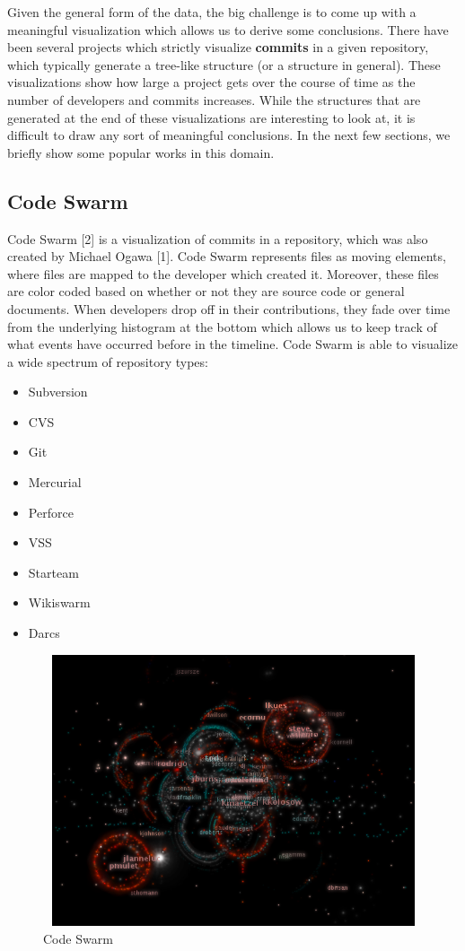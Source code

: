 \documentclass{article}
\begin{document}
Given the general form of the data, the big challenge is to come up with a meaningful visualization which allows us to derive some conclusions.  There have been several projects which strictly visualize \textbf{commits} in a given repository, which typically generate a tree-like structure (or a structure in general). These visualizations show how large a project gets over the course of time as the number of developers and commits increases. While the structures that are generated at the end of these visualizations are interesting to look at, it is difficult to draw any sort of meaningful conclusions. In the next few sections, we briefly show some popular works in this domain.

\subsection {Code Swarm}

Code Swarm [2] is a visualization of commits in a repository, which was also created by Michael Ogawa [1]. Code Swarm represents files as moving elements, where files are mapped to the developer which created it. Moreover, these files are color coded based on whether or not they are source code or general documents. When developers drop off in their contributions, they fade over time from the underlying histogram at the bottom which allows us to keep track of what events have occurred before in the timeline. Code Swarm is able to visualize a wide spectrum of repository types: 

\begin {itemize}
	\item {Subversion}
	\item {CVS}
	\item {Git}
	\item {Mercurial}
	\item {Perforce}
	\item {VSS}
	\item {Starteam}
	\item {Wikiswarm}
	\item {Darcs}
\end {itemize}

\begin{figure}[h!]
\centering
\includegraphics[height=8cm, width=12cm]{swarm}
\caption{Code Swarm}
\end{figure}
\end{document}
